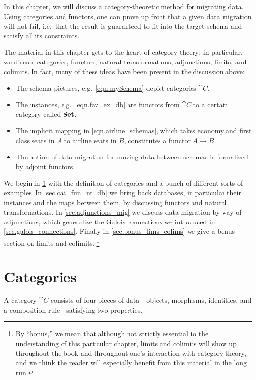 \documentclass[7Sketches]{subfiles}
\begin{document}
In this chapter, we will discuss a category-theoretic method for migrating data. Using categories and functors, one can prove up front that a given data migration will not fail, i.e.\ that the result is guaranteed to fit into the target schema and satisfy all its constraints.

The material in this chapter gets to the heart of category theory: in particular, we discuss categories, functors, natural transformations, adjunctions, limits, and colimits. In fact, many of these ideas have been present in the discussion above:
\begin{itemize}
	\item The schema pictures, e.g.\ \cref{eqn.mySchema} depict categories $\cat{C}$.
	\item The instances, e.g.\ \cref{eqn.fav_ex_db} are functors from $\cat{C}$ to a certain category called $\mathbf{Set}$.
	\item The implicit mapping in \cref{eqn.airline_schemas}, which takes economy and first class seats in $A$ to airline seats in $B$, constitutes a functor $A\to B$.
	\item The notion of data migration for moving data between schemas is formalized by  adjoint functors.
\end{itemize}

We begin in \cref{sec.categories} with the definition of categories and a bunch of different sorts of examples. In \cref{sec.cat_fun_nt_db} we bring back databases, in particular their instances and the maps between them, by discussing functors and natural transformations. In \cref{sec.adjunctions_mig} we discuss data migration by way of adjunctions, which generalize the Galois connections we introduced in \cref{sec.galois_connections}. Finally in \cref{sec.bonus_lims_colims} we give a bonus section on limits and colimits.%
\footnote{By ``bonus,'' we mean that although not strictly essential
to the understanding of this particular chapter, limits and colimits will show up throughout the book and throughout
one's interaction with category theory, and we think the reader will especially
benefit from this material in the long run.}

%

\section{Categories}%
\label{sec.categories}%

A category $\cat{C}$ consists of four pieces of data---objects, morphisms,
identities, and a composition rule---satisfying two properties.
\end{document}
